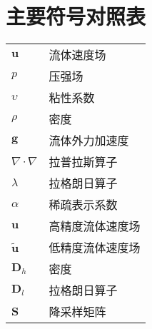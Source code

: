 
\chapter{主要符号对照表}
\label{chap:symb}
\begin{tabular}{ll}

 \hspace{2em}${\boldsymbol u}$       & \hspace{5em}流体速度场 \\
 \hspace{2em}$p$ \qquad     & \hspace{5em}压强场 \\
 \hspace{2em}$\upsilon$       & \hspace{5em}粘性系数 \\
 \hspace{2em}$\rho$ \qquad     & \hspace{5em}密度 \\
 \hspace{2em}${\boldsymbol g}$ \qquad     & \hspace{5em}流体外力加速度 \\
 \hspace{2em}${\nabla \cdot \nabla}$ \qquad     & \hspace{5em}拉普拉斯算子 \\
 \hspace{2em}$\lambda$ \qquad     & \hspace{5em}拉格朗日算子 \\
 \hspace{2em}$\alpha$ \qquad    & \hspace{5em}稀疏表示系数 \\
 \hspace{2em}${\boldsymbol u}$       & \hspace{5em}高精度流体速度场 \\
 \hspace{2em}${\boldsymbol {\tilde u} }$ \qquad & \hspace{5em}低精度流体速度场\\
 \hspace{2em}${\boldsymbol D_h}$ \qquad     & \hspace{5em}密度 \\
 \hspace{2em}${\boldsymbol D_l}$ \qquad     & \hspace{5em}拉格朗日算子 \\
 \hspace{2em}${\boldsymbol S}$ \qquad    & \hspace{5em}降采样矩阵 \\

\end{tabular}
